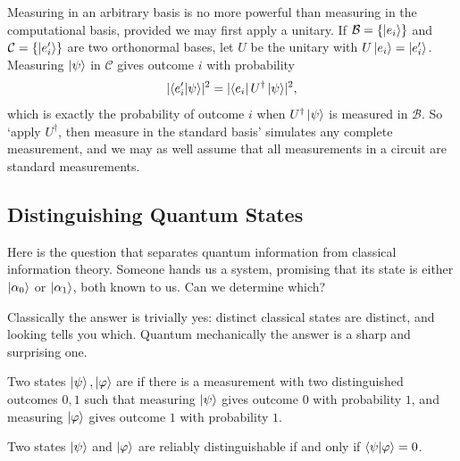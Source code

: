 \documentclass[a4paper]{scrartcl}
\newcommand{\Bs}{\mathcal{B}}
\begin{document}
\begin{remark}
	Measuring in an arbitrary basis is no more powerful than measuring in the computational basis, provided we may first apply a unitary. If $\Bs = \{\ket{e_i}\}$ and $\mathcal C = \{\ket{e_i'}\}$ are two orthonormal bases, let $U$ be the unitary with $U\ket{e_i} = \ket{e_i'}$. Measuring $\ket{\psi}$ in $\mathcal{C}$ gives outcome $i$ with probability
	$$\abs{\ip{e_i'}{\psi}}^2 = \abs{\bra{e_i}U^\dagger\ket{\psi}}^2,$$
	which is exactly the probability of outcome $i$ when $U^\dagger\ket{\psi}$ is measured in $\Bs$. So `apply $U^\dagger$, then measure in the standard basis' simulates any complete measurement, and we may as well assume that all measurements in a circuit are standard measurements.
\end{remark}

\subsection{Distinguishing Quantum States}\label{sec:distinguish}

Here is the question that separates quantum information from classical information theory. Someone hands us a system, promising that its state is either $\ket{\alpha_0}$ or $\ket{\alpha_1}$, both known to us. Can we determine which?

Classically the answer is trivially yes: distinct classical states are distinct, and looking tells you which. Quantum mechanically the answer is a sharp and surprising one.

\begin{definition}
	Two states $\ket{\psi},\ket{\varphi}$ are  if there is a measurement with two distinguished outcomes $0,1$ such that measuring $\ket{\psi}$ gives outcome $0$ with probability $1$, and measuring $\ket{\varphi}$ gives outcome $1$ with probability $1$.
\end{definition}

\begin{theorem}
	Two states $\ket{\psi}$ and $\ket{\varphi}$ are reliably distinguishable if and only if $\ip{\psi}{\varphi} = 0$.
\end{theorem}
\end{document}

